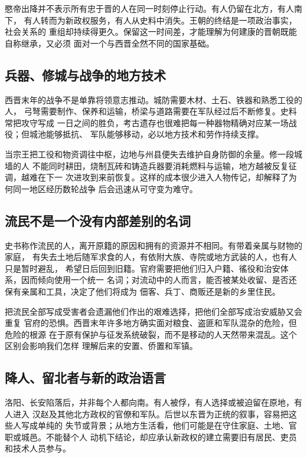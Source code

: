愍帝出降并不表示所有忠于晋的人在同一时刻停止行动。有人仍留在北方，有人南下，
有人转而为新政权服务，有人从史料中消失。王朝的终结是一项政治事实，社会关系的
重组却持续得更久。保留这一时间差，才能理解为何建康的晋朝既能自称继承，又必须
面对一个与西晋全然不同的国家基础。

\subsection{兵器、修城与战争的地方技术}

西晋末年的战争不是单靠将领意志推动。城防需要木材、土石、铁器和熟悉工役的人，
弓弩需要制作、保养和运输，桥梁与道路需要在军队经过后不断修复。史料常把攻守写成
一日之间的胜负，考古遗存也很难把每一种器物精确对应某一场战役；但城池能够抵抗、
军队能够移动，必以地方技术和劳作持续支撑。

当宗王把工役和物资调往中枢，边地与州县便失去维护自身防御的余量。修一段城墙的人
不能同时耕田，烧制瓦砖和铸造兵器要消耗燃料与运输，地方越被反复征调，越难在下一
次进攻到来前恢复。这样的成本很少进入人物传记，却解释了为何同一地区经历数轮战争
后会迅速从可守变为难守。

\subsection{流民不是一个没有内部差别的名词}

史书称作流民的人，离开原籍的原因和拥有的资源并不相同。有带着亲属与财物的家庭，
有失去土地后随军求食的人，有依附大族、寺院或地方武装的人，也有人只是暂时避乱，
希望日后回到旧籍。官府需要把他们归入户籍、徭役和治安体系，因而倾向使用一个统一
名词；对流动中的人而言，能否被某处收留、是否还保有亲属和工具，决定了他们将成为
佃客、兵丁、商贩还是新的乡里住民。

把流民全部写成受害者会遗漏他们作出的艰难选择，把他们全部写成治安威胁又会重复
官府的恐惧。西晋末年许多地方确实面对粮食、盗匪和军队混杂的危险，但危险的根源
在于原有保护与征发系统破裂，而不是移动的人天然带来混乱。这个区别会影响我们怎样
理解后来的安置、侨置和军镇。

\subsection{降人、留北者与新的政治语言}

洛阳、长安陷落后，并非每个人都向南。有人被俘，有人选择或被迫留在原地，有人进入
汉赵及其他北方政权的官僚和军队。后世以东晋为正统的叙事，容易把这些人写成单纯的
失节或背景；从地方生活看，他们可能是在守住家庭、土地、官职或城邑。不能替个人
动机下结论，却应承认新政权的建立需要旧有居民、吏员和技术人员参与。

